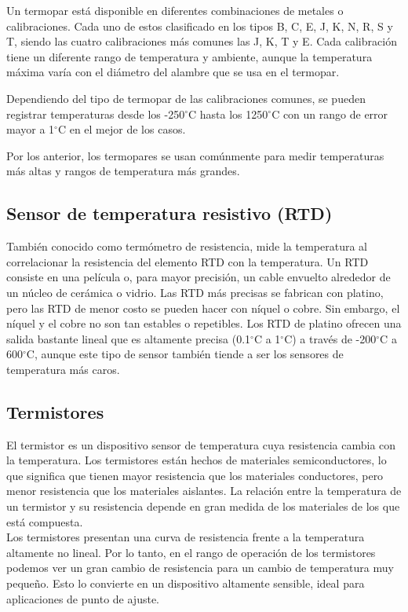 	Un termopar está disponible en diferentes combinaciones de metales o calibraciones. Cada uno de estos clasificado en los tipos B, C, E, J, K, N, R, S y T, siendo las cuatro calibraciones más comunes las J, K, T y E. Cada calibración tiene un diferente rango de temperatura y ambiente, aunque la temperatura máxima varía con el diámetro del alambre que se usa en el termopar. \cite{omegaTermopar}
	
	Dependiendo del tipo de termopar de las calibraciones comunes, se pueden registrar temperaturas desde los -250$^{\circ}$C hasta los 1250$^{\circ}$C con un rango de error mayor a 1$^{\circ}$C en el mejor de los casos.
	
	Por los anterior, los termopares se usan comúnmente para medir temperaturas más altas y rangos de temperatura más grandes. \cite{elprocusTempSens}	
	
	
	\subsection{Sensor de temperatura resistivo (RTD)}
	También conocido como termómetro de resistencia, mide la temperatura al correlacionar la resistencia del elemento RTD con la temperatura. Un RTD consiste en una película o, para mayor precisión, un cable envuelto alrededor de un núcleo de cerámica o vidrio. Las RTD más precisas se fabrican con platino, pero las RTD de menor costo se pueden hacer con níquel o cobre. Sin embargo, el níquel y el cobre no son tan estables o repetibles. Los RTD de platino ofrecen una salida bastante lineal que es altamente precisa (0.1$^{\circ}$C a 1$^{\circ}$C) a través de -200$^{\circ}$C a 600$^{\circ}$C, aunque este tipo de sensor también tiende a ser los sensores de temperatura más caros. \cite{amethermTemp}
	
	
	\subsection{Termistores}
	El termistor es un dispositivo sensor de temperatura cuya resistencia cambia con la temperatura. Los termistores están hechos de materiales semiconductores, lo que significa que tienen mayor resistencia que los materiales conductores, pero menor resistencia que los materiales aislantes. La relación entre la temperatura de un termistor y su resistencia depende en gran medida de los materiales de los que está compuesta. \cite{elprocusTempSens} \\

	Los termistores presentan una curva de resistencia frente a la temperatura altamente no lineal. Por lo tanto, en el rango de operación de los termistores podemos ver un gran cambio de resistencia para un cambio de temperatura muy pequeño. Esto lo convierte en un dispositivo altamente sensible, ideal para aplicaciones de punto de ajuste. \\

